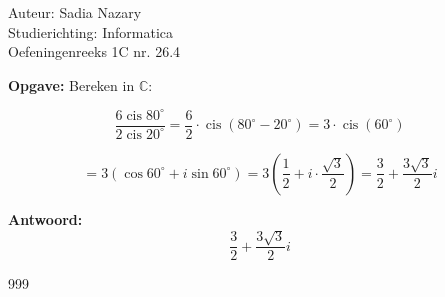 \documentclass[a4paper]{article}
\begin{document}
  
\noindent \large Auteur: Sadia Nazary \\
\noindent \large Studierichting: Informatica\\
\noindent \large Oefeningenreeks 1C nr. 26.4\\

\medskip

\normalsize

\textbf{Opgave:} Bereken in $ \mathbb{C} $:

\[
\dfrac{6 \operatorname{cis} 80^\circ}{2 \operatorname{cis} 20^\circ}
= \dfrac{6}{2} \cdot \operatorname{cis}(80^\circ - 20^\circ)
= 3 \cdot \operatorname{cis}(60^\circ)
\]

\[
= 3 \left( \cos 60^\circ + i \sin 60^\circ \right)
= 3 \left( \dfrac{1}{2} + i \cdot \dfrac{\sqrt{3}}{2} \right)
= \dfrac{3}{2} + \dfrac{3\sqrt{3}}{2}i
\]

\textbf{Antwoord: } 
\[
\boxed{\dfrac{3}{2} + \dfrac{3\sqrt{3}}{2}i}
\]

\begin{thebibliography}{999}
\end{thebibliography}
\end{document}

